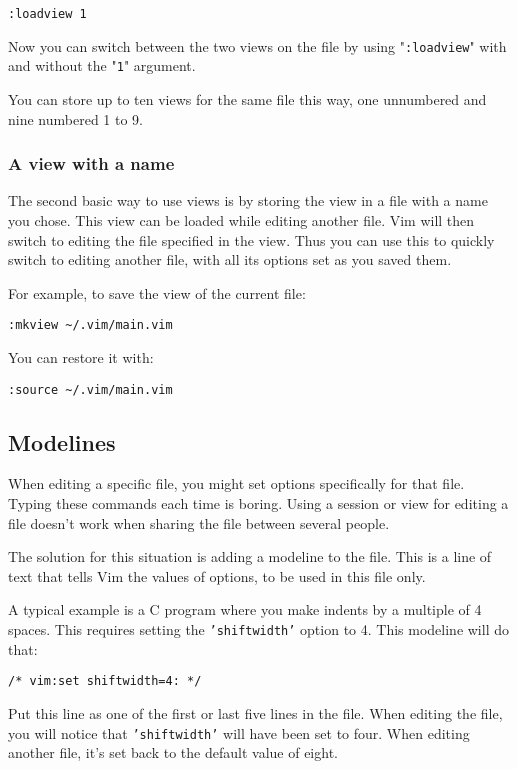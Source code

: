 \begin{Verbatim}[samepage=true]
 :loadview 1
\end{Verbatim}

Now you can switch between the two views on the file by using "\texttt{:loadview}" with and without the "\texttt{1}" argument.

You can store up to ten views for the same file this way, one unnumbered and nine numbered 1 to 9.
\subsubsection{A view with a name}
The second basic way to use views is by storing the view in a file with a name you chose.
This view can be loaded while editing another file.
Vim will then switch to editing the file specified in the view.
Thus you can use this to quickly switch to editing another file, with all its options set as you saved them.

For example, to save the view of the current file:

\begin{Verbatim}[samepage=true]
 :mkview ~/.vim/main.vim
\end{Verbatim}

You can restore it with:

\begin{Verbatim}[samepage=true]
 :source ~/.vim/main.vim
\end{Verbatim}
\subsection{Modelines}
When editing a specific file, you might set options specifically for that file.
Typing these commands each time is boring.
Using a session or view for editing a file doesn't work when sharing the file between several people.

The solution for this situation is adding a modeline to the file.
This is a line of text that tells Vim the values of options, to be used in this file only.

A typical example is a C program where you make indents by a multiple of 4 spaces.
This requires setting the \texttt{'shiftwidth'} option to 4.
This modeline will do that:

\begin{Verbatim}[samepage=true]
    /* vim:set shiftwidth=4: */ 
\end{Verbatim}

Put this line as one of the first or last five lines in the file.
When editing the file, you will notice that \texttt{'shiftwidth'} will have been set to four.
When editing another file, it's set back to the default value of eight.

